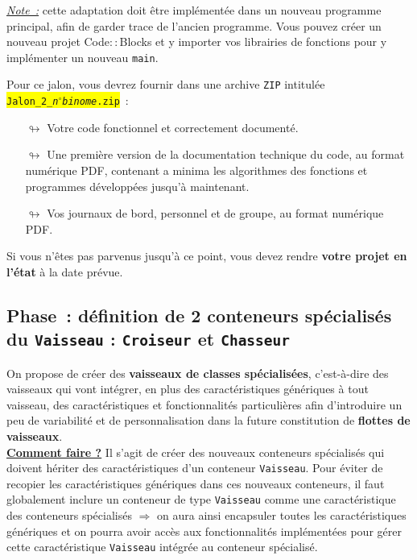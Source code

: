 \documentclass[10pt, fleqn, a4paper]{article}
\newcommand{\codeblocks}{Code$::$Blocks\xspace}
\newcommand{\bfcolor}[2]{\textcolor{#1}{\textbf{#2}}}
\newcommand{\itcolor}[2]{\textcolor{#1}{\textit{#2}}}
\newcommand\myframecolor{}
\newcommand\mybgcolor{}
\newenvironment{mycolorbox}[2]
{
\def\myframecolor{#1}
\def\mybgcolor{#2}
\begingroup
\begin{lrbox}{\mytextbox}
\begin{minipage}[t]{\textwidth}
}
{
\end{minipage}\end{lrbox}
\fcolorbox{\myframecolor}{\mybgcolor}{\usebox{\mytextbox}}
\endgroup
}
\newcounter{quest}
\begin{document}
\begin{mycolorbox}{black}{yellow}
\itcolor{redCM}{\underline{Note~:}} cette adaptation doit être implémentée dans un nouveau programme principal, afin de garder trace de l'ancien programme. Vous pouvez créer un nouveau projet \codeblocks et y importer vos librairies de fonctions pour y implémenter un nouveau \texttt{main}.
\end{mycolorbox}

\vspace{5mm}
\begin{mycolorbox}{black}{orange}
Pour ce jalon, vous devrez fournir dans une archive \texttt{ZIP} intitulée\\ \colorbox{yellow}{\texttt{Jalon\_2\_\textit{n$^\circ$binome}.zip}}~:
\begin{itemize}
\item[$\looparrowright$] Votre code fonctionnel et correctement documenté.
\item[$\looparrowright$] Une première version de la documentation technique du code, au format numérique PDF, contenant a minima les algorithmes des fonctions et programmes développées jusqu'à maintenant.
\item[$\looparrowright$] Vos journaux de bord, personnel et de groupe, au format numérique PDF.
\end{itemize}
\begin{mycolorbox}{black}{yellow}Si vous n'êtes pas parvenus jusqu'à ce point, vous devez rendre \textbf{votre projet en l'état} à la date prévue.\end{mycolorbox}
\end{mycolorbox}

\addtocounter{quest}{1}
\subsection*{Phase~\thequest : définition de 2 conteneurs \og{}spécialisés\fg{} du \texttt{Vaisseau} : \texttt{Croiseur} et \texttt{Chasseur}}
\label{phase_heritage}

On propose de créer des \bfcolor{blueTD}{vaisseaux de classes spécialisées}, c'est-à-dire des vaisseaux qui vont intégrer, en plus des caractéristiques génériques à tout vaisseau, des caractéristiques et fonctionnalités particulières afin d'introduire un peu de variabilité et de personnalisation dans la future constitution de \bfcolor{blueTD}{flottes de vaisseaux}.\\
\bfcolor{redCM}{\underline{Comment faire ?}} Il s'agit de créer des nouveaux conteneurs \og{}spécialisés\fg{} qui doivent \og{}hériter\fg{} des caractéristiques d'un conteneur \texttt{Vaisseau}. Pour éviter de \og{}recopier\fg{} les caractéristiques génériques dans ces nouveaux conteneurs, il faut globalement inclure un conteneur de type \texttt{Vaisseau} comme une caractéristique des conteneurs spécialisés $\Rightarrow$ on aura ainsi \og{}encapsuler\fg{} toutes les caractéristiques génériques et on pourra avoir accès aux fonctionnalités implémentées pour gérer cette caractéristique \texttt{Vaisseau} intégrée au conteneur spécialisé. 
\end{document}
